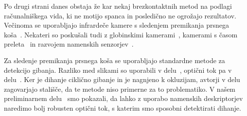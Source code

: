 Po drugi strani danes obstaja že kar nekaj brezkontaktnih metod na podlagi računalniškega vida, ki ne motijo spanca in posledično ne ogrožajo rezultatov. Večinoma se uporabljajo infrardeče kamere s sledenjem premikanja prsnega koša~\cite{sathyanarayana2015vision}. Nekateri so poskušali tudi z globinskimi kamerami~\cite{yang2014sleep}, kamerami s časom preleta~\cite{falie2009statistical} in razvojem namenskih senzorjev~\cite{takemura2005respiratory}.

Za sledenje premikanja prsnega koša se uporabljajo standardne metode za detekcijo gibanja. Razliko med slikami so uporabili v delu~\cite{nakai2000non}, optični tok pa v delu~\cite{nakajima2001development}. Ker je dihanje ciklično gibanje in je nagnjeno k okluzijam, avtorji v delu~\cite{wang2014unconstrained} zagovarjajo stališče, da te metode niso primerne za to problematiko. V našem preliminarnem delu~\cite{koporec2017observation} smo pokazali, da lahko z uporabo namenskih deskriptorjev naredimo bolj robusten optični tok, s katerim smo sposobni detektirati dihanje.